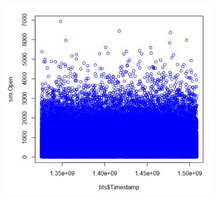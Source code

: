 \documentclass{article}
\begin{document}
\begin{figure}[H]
\includegraphics[width=\textwidth]{blue.png}

\label{sampli}
\end{figure}
\end{document}
